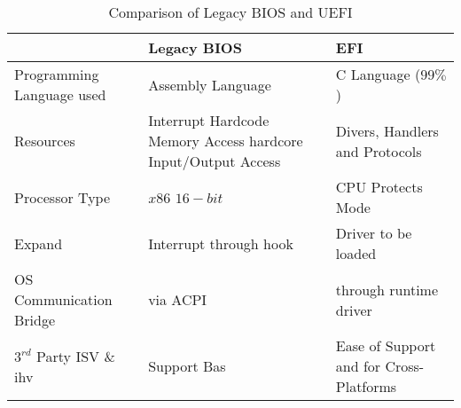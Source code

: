 \begin{table}
	\centering
	\renewcommand{\arraystretch}{2}
	\caption{Comparison of Legacy BIOS and UEFI}\label{table:legacy-bios-vs-uefi}
	\begin{tabular}{l | p{5cm} | p{5cm}}
		& Legacy BIOS & EFI
		\\ \hline \hline
		Programming Language used & Assembly Language & C Language ($ 99\% $)
		\\ \hline
		Resources & Interrupt Hardcode Memory Access hardcore Input/Output Access & Divers, Handlers and Protocols
		\\ \hline
		Processor Type & $ x86 $ $ 16-bit $ & CPU Protects Mode
		\\ \hline
		Expand & Interrupt through hook & Driver to be loaded
		\\ \hline
		OS Communication Bridge & via ACPI & through runtime driver
		\\ \hline
		$ 3^{rd} $ Party ISV \& \gls{ihv} & Support Bas & Ease of Support and for Cross-Platforms
		\\ \hline
	\end{tabular}
\end{table}





